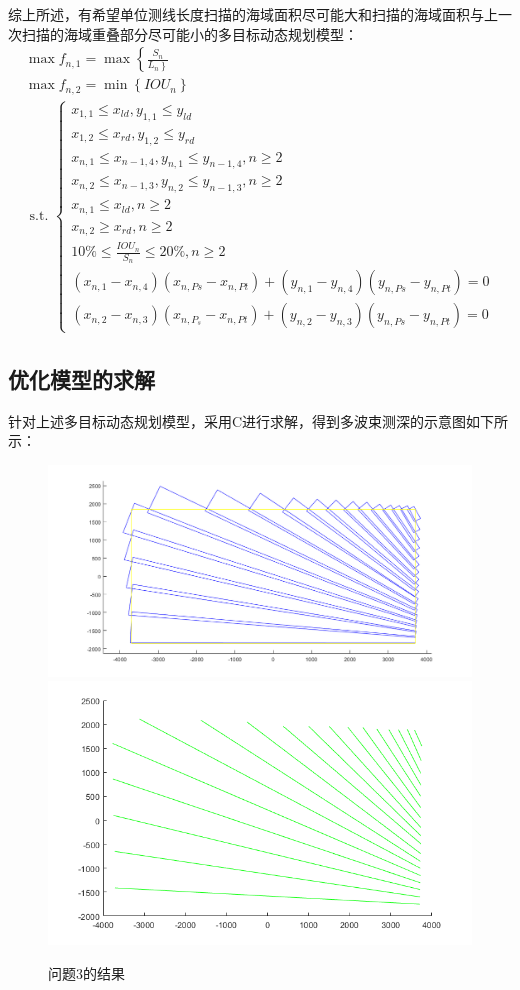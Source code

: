 \documentclass[12pt,a4paper]{article}
\begin{document}
	综上所述，有希望单位测线长度扫描的海域面积尽可能大和扫描的海域面积与上一次扫描的海域重叠部分尽可能小的多目标动态规划模型：
	$$
	\begin{gathered}
		\max f_{n, 1}=\max \left\{\frac{S_n}{\left.L_n\right\}}\right. \\
		\max f_{n, 2}=\min \left\{I O U_n\right\} \\
		\text { s.t. }\left\{\begin{array}{l}
			x_{1,1} \leq x_{l d}, y_{1,1} \leq y_{l d} \\
			x_{1,2} \leq x_{r d}, y_{1,2} \leq y_{r d} \\
			x_{n, 1} \leq x_{n-1,4}, y_{n, 1} \leq y_{n-1,4}, n \geq 2 \\
			x_{n, 2} \leq x_{n-1,3}, y_{n, 2} \leq y_{n-1,3}, n \geq 2 \\
			x_{n, 1} \leq x_{l d}, n \geq 2 \\
			x_{n, 2} \geq x_{r d}, n \geq 2 \\
			10 \% \leq \frac{I O U_n}{S_n} \leq 20 \%, n \geq 2 \\
			\left(x_{n, 1}-x_{n, 4}\right)\left(x_{n, P s}-x_{n, P t}\right)+\left(y_{n, 1}-y_{n, 4}\right)\left(y_{n, P s}-y_{n, P t}\right)=0 \\
			\left(x_{n, 2}-x_{n, 3}\right)\left(x_{n, P_s}-x_{n, P t}\right)+\left(y_{n, 2}-y_{n, 3}\right)\left(y_{n, P s}-y_{n, P t}\right)=0
		\end{array}\right.
	\end{gathered}
	$$
	
	
	\subsection{优化模型的求解}
	针对上述多目标动态规划模型，采用C进行求解，得到多波束测深的示意图如下所示：
	\begin{figure}[H]
		\centering
		\includegraphics[width=0.5\linewidth]{media/image58}
		\includegraphics[width=0.4\linewidth]{media/image59}
		\caption{问题3的结果}
		\label{fig5}
	\end{figure}
	
\end{document}
